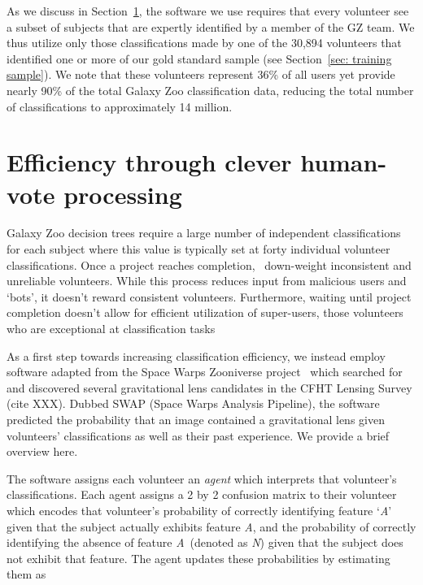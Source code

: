 \documentclass[twocolumn]{aastex6}
\newcommand{\A}{\textit{A}}
\newcommand{\N}{\textit{N}}
\begin{document}
As we discuss in Section~\ref{sec: SWAP}, the software we use requires that every volunteer see a
subset of subjects that are expertly identified by a member of the GZ team. 
We thus utilize only those classifications made by one of the 30,894 volunteers that identified one or more of
our gold standard sample (see Section~\ref{sec: training sample}). 
We note that these volunteers represent 36\% of all users 
yet provide nearly 90\% of the total Galaxy Zoo classification data, 
reducing the total number of classifications to approximately 14 million.



\section{Efficiency through clever human-vote processing}\label{sec: SWAP}

Galaxy Zoo decision trees require a large 
number of independent classifications for each subject where this value is typically 
set at forty individual volunteer classifications. 
Once a project reaches completion,~\cite{Willett2013} down-weight inconsistent 
and unreliable volunteers.  
While this process reduces input from malicious users and `bots', 
it doesn't reward consistent volunteers. Furthermore, waiting until project completion 
doesn't allow for efficient utilization of super-users, those volunteers who are 
exceptional at classification tasks

As a first step towards increasing classification efficiency, we instead employ 
software adapted from the Space Warps Zooniverse project~\citep{Marshall2016} 
which searched for and discovered several gravitational lens 
candidates in the CFHT Lensing Survey (cite XXX).  Dubbed SWAP (Space Warps Analysis Pipeline),  
the software predicted the probability that an image contained a gravitational lens given 
volunteers' classifications as well as their past experience. We provide a brief overview here.  

The software assigns each volunteer an \textit{agent} which interprets that volunteer's 
classifications. Each agent assigns a 2 by 2 confusion matrix to their volunteer which encodes
that volunteer's probability of correctly identifying feature `\A'  given that the subject 
actually exhibits feature \A, and the probability of correctly identifying
the absence of feature \A~(denoted as \N) given that the subject does not exhibit 
that feature. The agent updates these probabilities by estimating them as 
\end{document}
